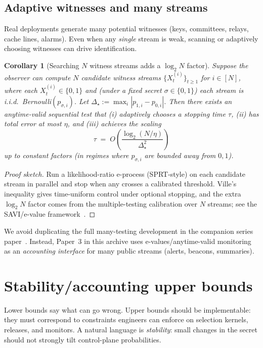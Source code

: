 \documentclass[11pt]{article}
\newtheorem{corollary}{Corollary}
\begin{document}
\subsection{Adaptive witnesses and many streams}
Real deployments generate many potential witnesses (keys, committees, relays, cache lines, alarms).
Even when any \emph{single} stream is weak, scanning or adaptively choosing witnesses can drive identification.

\begin{corollary}[Searching $N$ witness streams adds a $\log_2 N$ factor]
\label{cor:many-witness-search}
Suppose the observer can compute $N$ candidate witness streams
$\{X^{(i)}_t\}_{t\ge 1}$ for $i\in[N]$, where each $X^{(i)}_t\in\{0,1\}$ and (under a fixed secret $\sigma\in\{0,1\}$) each stream is i.i.d.\ Bernoulli$(p_{\sigma,i})$.
Let $\Delta_\star := \max_i |p_{1,i}-p_{0,i}|$.
Then there exists an anytime-valid sequential test that (i) adaptively chooses a stopping time $\tau$,
(ii) has total error at most $\eta$, and (iii) achieves the scaling
\[
\tau \;=\; O\!\left(\frac{\log_2(N/\eta)}{\Delta_\star^2}\right)
\]
up to constant factors (in regimes where $p_{\sigma,i}$ are bounded away from $0,1$).
\end{corollary}

\begin{proof}[Proof sketch]
Run a likelihood-ratio e-process (SPRT-style) on each candidate stream in parallel and stop when any crosses a calibrated threshold.
Ville's inequality gives time-uniform control under optional stopping, and the extra $\log_2 N$ factor comes from the multiple-testing calibration over $N$ streams; see the SAVI/e-value framework~\cite{ramdas2024evalues,wang2025sebH}.
\end{proof}

We avoid duplicating the full many-testing development in the companion series paper~\cite{series:manytestinglowerbounds}.
Instead, Paper~3 in this archive uses e-values/anytime-valid monitoring as an \emph{accounting interface} for many public streams (alerts, beacons, summaries).


\section{Stability/accounting upper bounds}
\label{sec:upper}

Lower bounds say what can go wrong.
Upper bounds should be implementable: they must correspond to constraints engineers can enforce on selection kernels, releases, and monitors.
A natural language is \emph{stability}: small changes in the secret should not strongly tilt control-plane probabilities.
\end{document}
